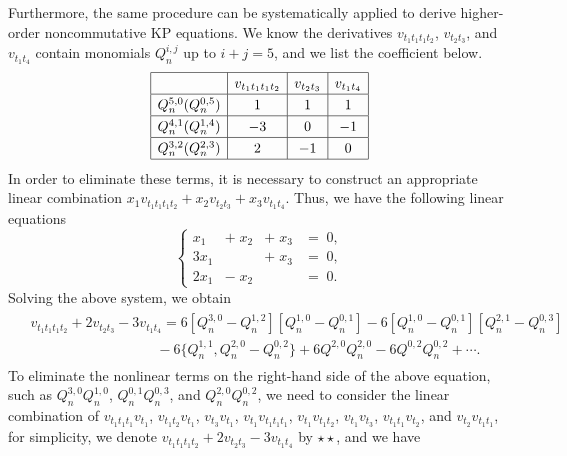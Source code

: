 \documentclass[11p,reqno]{amsart}
\numberwithin{equation}{section}
\numberwithin{equation}{section}
\begin{document}
Furthermore, the same procedure can be systematically applied to derive higher-order noncommutative KP equations. We know the derivatives $v_{t_1t_1t_1t_2}$, $v_{t_2t_3}$, and $v_{t_1t_4}$ contain monomials $Q_n^{i, j}$ up to $i+j=5$, and we list the coefficient below.  
\begin{equation} \nonumber
    \renewcommand{\arraystretch}{1.25}
    \begin{array}{|c|c|c|c|}
        \hline
         & v_{t_1t_1t_1t_2} & v_{t_2t_3} & v_{t_1t_4} \\ \hline
        Q_n^{5, 0}(Q_n^{0, 5}) & 1 & 1 & 1 \\ \hline
        Q_n^{4, 1}(Q_n^{1, 4}) & -3 & 0 & -1 \\ \hline
        Q_n^{3, 2}(Q_n^{2, 3}) & 2 & -1 & 0 \\ \hline
    \end{array}
\end{equation}
In order to eliminate these terms, it is necessary to construct an appropriate linear combination $x_1v_{t_1t_1t_1t_2}+x_2v_{t_2t_3}+x_3v_{t_1t_4}$. Thus, we have the following linear equations
\begin{equation} \nonumber
    \left\{
    \begin{array}{rrrrrl}
    x_1 & +\; x_2 & +\;  x_3 & =\; 0, \\
    3x_1 & \;   & +\; x_3 & =\; 0, \\
    2x_1 & -\; x_2 & \;   & =\; 0.
    \end{array}
    \right.
\end{equation}
Solving the above system, we obtain
\begin{align}  \label{part_2}
    \begin{aligned}
       &v_{t_1t_1t_1t_2} + 2 v_{t_2t_3} - 3v_{t_1t_4} = 6[Q_n^{3, 0} - Q_n^{1, 2}][Q_n^{1, 0} - Q_n^{0, 1}] - 6[Q_n^{1, 0} - Q_n^{0, 1}][Q_n^{2, 1} - Q_n^{0, 3}] \\
       & \qquad\qquad\qquad\qquad\quad - 6\{Q_n^{1, 1}, Q_n^{2, 0} - Q_n^{0, 2}\} + 6Q^{2, 0}Q_n^{2, 0} - 6Q^{0, 2}Q_n^{0, 2} + \cdots. 
    \end{aligned}
\end{align}
To eliminate the nonlinear terms on the right-hand side of the above equation, such as 
$Q_n^{3, 0}Q_n^{1, 0}$, $Q_n^{0, 1}Q_n^{0, 3}$, and $Q_n^{2, 0}Q_n^{0, 2}$, we need to consider the linear combination of $v_{t_1t_1t_1} v_{t_1}$, $v_{t_1t_2} v_{t_1}$, $v_{t_3} v_{t_1}$, $v_{t_1} v_{t_1t_1t_1}$, $v_{t_1} v_{t_1t_2}$, $v_{t_1} v_{t_3}$, $v_{t_1t_1} v_{t_2}$, and $v_{t_2} v_{t_1t_1}$, for simplicity, we denote $v_{t_1t_1t_1t_2} + 2 v_{t_2t_3} - 3v_{t_1t_4}$ by $\star\star$, and we have
\end{document}
